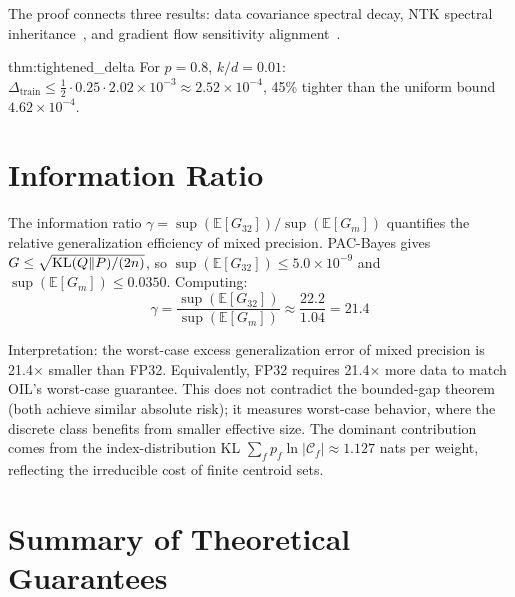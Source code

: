 The proof connects three results: data covariance spectral decay, NTK
spectral inheritance~\cite{jacot2018}, and gradient flow sensitivity
alignment~\cite{rahaman2019}.

\begin{mycor}{thm:tightened_delta}
For $p = 0.8$, $k/d = 0.01$: $\Delta_{\text{train}} \leq \frac{1}{2}
\cdot 0.25 \cdot 2.02 \times 10^{-3} \approx 2.52 \times 10^{-4}$, 45\%
tighter than the uniform bound $4.62 \times 10^{-4}$.
\end{mycor}

\section{Information Ratio}
\label{sec:info_ratio}

The information ratio $\gamma = \sup(\mathbb{E}[G_{32}]) /
\sup(\mathbb{E}[G_m])$ quantifies the relative generalization efficiency
of mixed precision.  PAC-Bayes gives $G \leq \sqrt{\mathrm{KL}(Q \| P) / (2n)}$,
so $\sup(\mathbb{E}[G_{32}]) \leq 5.0 \times 10^{-9}$ and
$\sup(\mathbb{E}[G_m]) \leq 0.0350$.  Computing:
\begin{equation}
\gamma = \frac{\sup(\mathbb{E}[G_{32}])}{\sup(\mathbb{E}[G_m])} \approx
\frac{22.2}{1.04} = 21.4
\label{eq:info_ratio_value}
\end{equation}

Interpretation: the worst-case excess generalization error of mixed
precision is 21.4$\times$ smaller than FP32.  Equivalently, FP32 requires
21.4$\times$ more data to match OIL's worst-case guarantee.  This does not
contradict the bounded-gap theorem (both achieve similar absolute risk);
it measures worst-case behavior, where the discrete class benefits from
smaller effective size.  The dominant contribution comes from the
index-distribution KL $\sum_f p_f \ln |\mathcal{C}_f| \approx 1.127$ nats
per weight, reflecting the irreducible cost of finite centroid sets.

\section{Summary of Theoretical Guarantees}
\label{sec:theory_summary}

